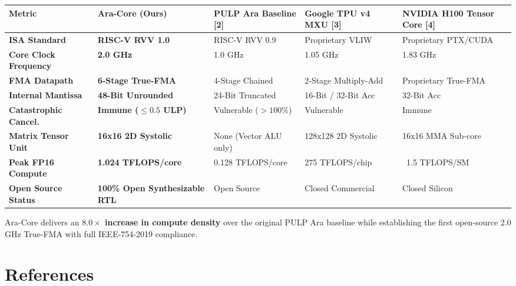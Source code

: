 \documentclass[journal,10pt,twocolumn]{IEEEtran}
\begin{document}
\begin{table}[htbp]
\centering\footnotesize
\begin{tabular}{p{} p{} p{} p{} p{}}
\toprule
\textbf{Metric} & \textbf{Ara-Core (Ours)} & \textbf{PULP Ara Baseline [2]} & \textbf{Google TPU v4 MXU [3]} & \textbf{NVIDIA H100 Tensor Core [4]} \\
\midrule
\textbf{ISA Standard} & \textbf{RISC-V RVV 1.0} & RISC-V RVV 0.9 & Proprietary VLIW & Proprietary PTX/CUDA \\
\textbf{Core Clock Frequency} & \textbf{2.0 GHz} & 1.0 GHz & 1.05 GHz & 1.83 GHz \\
\textbf{FMA Datapath} & \textbf{6-Stage True-FMA} & 4-Stage Chained & 2-Stage Multiply-Add & Proprietary True-FMA \\
\textbf{Internal Mantissa} & \textbf{48-Bit Unrounded} & 24-Bit Truncated & 16-Bit / 32-Bit Acc & 32-Bit Acc \\
\textbf{Catastrophic Cancel.} & \textbf{Immune ($\le 0.5$ ULP)} & Vulnerable ($>100\%$) & Vulnerable & Immune \\
\textbf{Matrix Tensor Unit} & \textbf{16x16 2D Systolic} & None (Vector ALU only) & 128x128 2D Systolic & 16x16 MMA Sub-core \\
\textbf{Peak FP16 Compute} & \textbf{1.024 TFLOPS/core} & 0.128 TFLOPS/core & 275 TFLOPS/chip & ~1.5 TFLOPS/SM \\
\textbf{Open Source Status} & \textbf{100\% Open Synthesizable RTL} & Open Source & Closed Commercial & Closed Silicon \\
\bottomrule
\end{tabular}
\vspace{4pt}
\end{table}

Ara-Core delivers an \textbf{$8.0\times$ increase in compute density} over the original PULP Ara baseline while establishing the first open-source 2.0 GHz True-FMA with full IEEE-754-2019 compliance.


\section{References}
\end{document}
